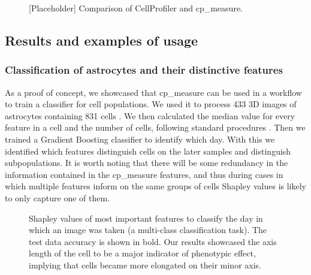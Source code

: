 \documentclass{article}
\begin{document}
\begin{figure}[htbp]
\centering

\caption{\label{fig:org7fe862f}{[}Placeholder] Comparison of CellProfiler and cp\_measure.}
\end{figure}
\subsection{Results and examples of usage}
\label{sec:org8ef524e}
\subsubsection{Classification of astrocytes and their distinctive features}
\label{sec:org3d97e6f}

As a proof of concept, we showcased that cp\_measure can be used in a workflow to train a classifier for cell populations. We used it to process 433 3D images of astrocytes containing 831 cells \citep{kalinin3DCellNuclear2018}. We then calculated the median value for every feature in a cell and the number of cells, following standard procedures \citep{caicedoDataanalysisStrategiesImagebased2017}. Then we trained a Gradient Boosting classifier to identify which day. With this we identified which features distinguish cells on the later samples and distinguish subpopulations. It is worth noting that there will be some redundancy in the information contained in the cp\_measure features, and thus during cases in which multiple features inform on the same groups of cells Shapley values is likely to only capture one of them.

\begin{figure}[htbp]
\centering

\caption{\label{fig:org4620d4d}Shapley values of most important features to classify the day in which an image was taken (a multi-class classification task). The test data accuracy is shown in bold. Our results showcased the axis length of the cell to be a major indicator of phenotypic effect, implying that cells became more elongated on their minor axis.}
\end{figure}
\end{document}
